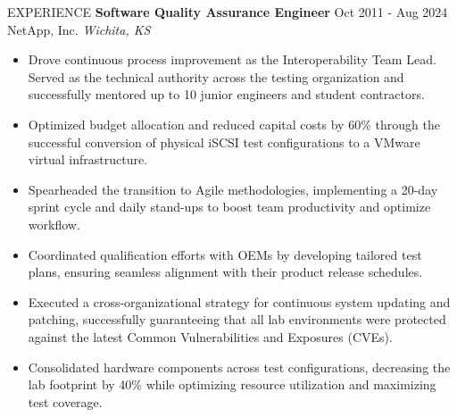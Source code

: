 \documentclass{faang} %
\begin{document}
\begin{rSection}{EXPERIENCE}
\textbf{Software Quality Assurance Engineer} \hfill {Oct 2011 - Aug 2024}\\
NetApp, Inc. \hfill \textit{Wichita, KS}
 \begin{itemize}
  \itemsep -3pt {} 
    \item Drove continuous process improvement as the Interoperability Team Lead. Served as the technical authority across the testing organization and successfully mentored up to 10 junior engineers and student contractors.
    \item Optimized budget allocation and reduced capital costs by 60\% through the successful conversion of physical iSCSI test configurations to a VMware virtual infrastructure.
    \item Spearheaded the transition to Agile methodologies, implementing a 20-day sprint cycle and daily stand-ups to boost team productivity and optimize workflow.
    \item Coordinated qualification efforts with OEMs by developing tailored test plans, ensuring seamless alignment with their product release schedules.
    \item Executed a cross-organizational strategy for continuous system updating and patching, successfully guaranteeing that all lab environments were protected against the latest Common Vulnerabilities and Exposures (CVEs).
    \item Consolidated hardware components across test configurations, decreasing the lab footprint by 40\% while optimizing resource utilization and maximizing test coverage.

\end{itemize}
\end{rSection}
\end{document}
